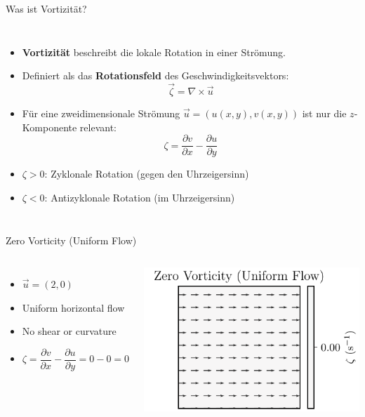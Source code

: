 
\begin{frame}{Was ist Vortizität?}
	\begin{columns}
		\begin{itemize}
			\item \textbf{Vortizität} beschreibt die lokale Rotation in einer Strömung.
			\item Definiert als das \textbf{Rotationsfeld} des Geschwindigkeitsvektors:
			      \[
				      \vec{\zeta} = \nabla \times \vec{u}
			      \]
			\item Für eine zweidimensionale Strömung \( \vec{u} = (u(x,y), v(x,y)) \) ist nur die \(z\)-Komponente relevant:
			      \[
				      \zeta = \dfrac{\partial v}{\partial x} - \frac{\partial u}{\partial y}
			      \]
			\item \(\zeta > 0\): Zyklonale Rotation (gegen den Uhrzeigersinn)
			\item \(\zeta < 0\): Antizyklonale Rotation (im Uhrzeigersinn)
		\end{itemize}

		\vspace{2cm}  %
	\end{columns}
\end{frame}


\begin{frame}{Zero Vorticity (Uniform Flow)}
	\begin{columns}
		\column{0.5\textwidth}
		\begin{itemize}
			\item \( \vec{u} = (2, 0) \)
			\item Uniform horizontal flow
			\item No shear or curvature
			\item \( \zeta = \dfrac{\partial v}{\partial x} - \dfrac{\partial u}{\partial y} = 0-0= 0 \)
		\end{itemize}

		\column{0.5\textwidth}
		\includegraphics[width=\linewidth]{../images/vorticity_plot0.pdf}
	\end{columns}
\end{frame}

